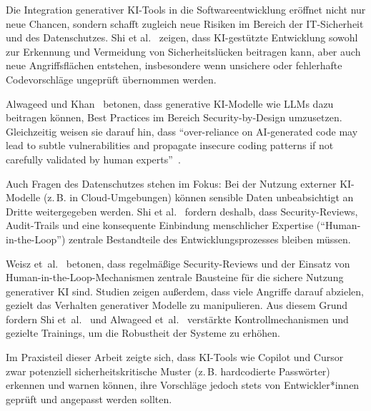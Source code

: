 Die Integration generativer KI-Tools in die Softwareentwicklung eröffnet nicht
nur neue Chancen, sondern schafft zugleich neue Risiken im Bereich der
IT-Sicherheit und des Datenschutzes. Shi et al.~\cite{shi_ai-assisted_2023}
zeigen, dass KI-gestützte Entwicklung sowohl zur Erkennung und Vermeidung von
Sicherheitslücken beitragen kann, aber auch neue Angriffsflächen entstehen,
insbesondere wenn unsichere oder fehlerhafte Codevorschläge ungeprüft
übernommen werden.

Alwageed und Khan~\cite{alwageed_role_nodate} betonen, dass generative
KI-Modelle wie LLMs dazu beitragen können, Best Practices im Bereich
Security-by-Design umzusetzen. Gleichzeitig weisen sie darauf hin, dass
\enquote{over-reliance on AI-generated code may lead to subtle vulnerabilities
    and propagate insecure coding patterns if not carefully validated by human
    experts}~\cite[S.~9]{alwageed_role_nodate}.

Auch Fragen des Datenschutzes stehen im Fokus: Bei der Nutzung externer
KI-Modelle (z.\,B. in Cloud-Umgebungen) können sensible Daten unbeabsichtigt an
Dritte weitergegeben werden. Shi et al.~\cite{shi_ai-assisted_2023} fordern
deshalb, dass Security-Reviews, Audit-Trails und eine konsequente Einbindung
menschlicher Expertise (\enquote{Human-in-the-Loop}) zentrale Bestandteile des
Entwicklungsprozesses bleiben müssen.

Weisz et~al.~\cite{weisz_design_2024} betonen, dass regelmäßige
Security-Reviews und der Einsatz von Human-in-the-Loop-Mechanismen zentrale
Bausteine für die sichere Nutzung generativer KI sind. Studien zeigen außerdem,
dass viele Angriffe darauf abzielen, gezielt das Verhalten generativer Modelle
zu manipulieren. Aus diesem Grund fordern Shi
et~al.~\cite{shi_ai-assisted_2023} und Alwageed
et~al.~\cite{alwageed_role_nodate} verstärkte Kontrollmechanismen und gezielte
Trainings, um die Robustheit der Systeme zu erhöhen.

Im Praxisteil dieser Arbeit zeigte sich, dass KI-Tools wie Copilot und Cursor
zwar potenziell sicherheitskritische Muster (z.\,B. hardcodierte Passwörter)
erkennen und warnen können, ihre Vorschläge jedoch stets von Entwickler*innen
geprüft und angepasst werden sollten.
